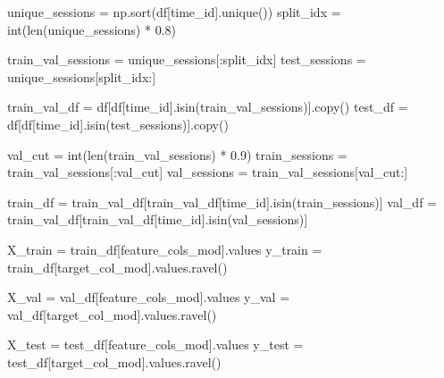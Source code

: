 \documentclass[
  letterpaper,
  DIV=11,
  numbers=noendperiod]{scrartcl}
\newenvironment{Shaded}{\begin{snugshade}}{\end{snugshade}}
\newcommand{\BuiltInTok}[1]{\textcolor[rgb]{0.00,0.23,0.31}{#1}}
\newcommand{\FloatTok}[1]{\textcolor[rgb]{0.68,0.00,0.00}{#1}}
\newcommand{\NormalTok}[1]{\textcolor[rgb]{0.00,0.23,0.31}{#1}}
\newcommand{\OperatorTok}[1]{\textcolor[rgb]{0.37,0.37,0.37}{#1}}
\newcommand{\StringTok}[1]{\textcolor[rgb]{0.13,0.47,0.30}{#1}}
\begin{document}
\begin{Shaded}
\begin{Highlighting}[]
\NormalTok{unique\_sessions }\OperatorTok{=}\NormalTok{ np.sort(df[}\StringTok{\textquotesingle{}time\_id\textquotesingle{}}\NormalTok{].unique())}
\NormalTok{split\_idx       }\OperatorTok{=} \BuiltInTok{int}\NormalTok{(}\BuiltInTok{len}\NormalTok{(unique\_sessions) }\OperatorTok{*} \FloatTok{0.8}\NormalTok{)}

\NormalTok{train\_val\_sessions }\OperatorTok{=}\NormalTok{ unique\_sessions[:split\_idx]}
\NormalTok{test\_sessions      }\OperatorTok{=}\NormalTok{ unique\_sessions[split\_idx:]}

\NormalTok{train\_val\_df }\OperatorTok{=}\NormalTok{ df[df[}\StringTok{\textquotesingle{}time\_id\textquotesingle{}}\NormalTok{].isin(train\_val\_sessions)].copy()}
\NormalTok{test\_df      }\OperatorTok{=}\NormalTok{ df[df[}\StringTok{\textquotesingle{}time\_id\textquotesingle{}}\NormalTok{].isin(test\_sessions)].copy()}

\NormalTok{val\_cut        }\OperatorTok{=} \BuiltInTok{int}\NormalTok{(}\BuiltInTok{len}\NormalTok{(train\_val\_sessions) }\OperatorTok{*} \FloatTok{0.9}\NormalTok{)}
\NormalTok{train\_sessions }\OperatorTok{=}\NormalTok{ train\_val\_sessions[:val\_cut]}
\NormalTok{val\_sessions   }\OperatorTok{=}\NormalTok{ train\_val\_sessions[val\_cut:]}
\end{Highlighting}
\end{Shaded}

\begin{Shaded}
\begin{Highlighting}[]
\NormalTok{train\_df }\OperatorTok{=}\NormalTok{ train\_val\_df[train\_val\_df[}\StringTok{\textquotesingle{}time\_id\textquotesingle{}}\NormalTok{].isin(train\_sessions)]}
\NormalTok{val\_df   }\OperatorTok{=}\NormalTok{ train\_val\_df[train\_val\_df[}\StringTok{\textquotesingle{}time\_id\textquotesingle{}}\NormalTok{].isin(val\_sessions)]}

\NormalTok{X\_train }\OperatorTok{=}\NormalTok{ train\_df[feature\_cols\_mod].values}
\NormalTok{y\_train }\OperatorTok{=}\NormalTok{ train\_df[target\_col\_mod].values.ravel()}

\NormalTok{X\_val   }\OperatorTok{=}\NormalTok{ val\_df[feature\_cols\_mod].values}
\NormalTok{y\_val   }\OperatorTok{=}\NormalTok{ val\_df[target\_col\_mod].values.ravel()}

\NormalTok{X\_test  }\OperatorTok{=}\NormalTok{ test\_df[feature\_cols\_mod].values}
\NormalTok{y\_test  }\OperatorTok{=}\NormalTok{ test\_df[target\_col\_mod].values.ravel()}
\end{Highlighting}
\end{Shaded}
\end{document}
